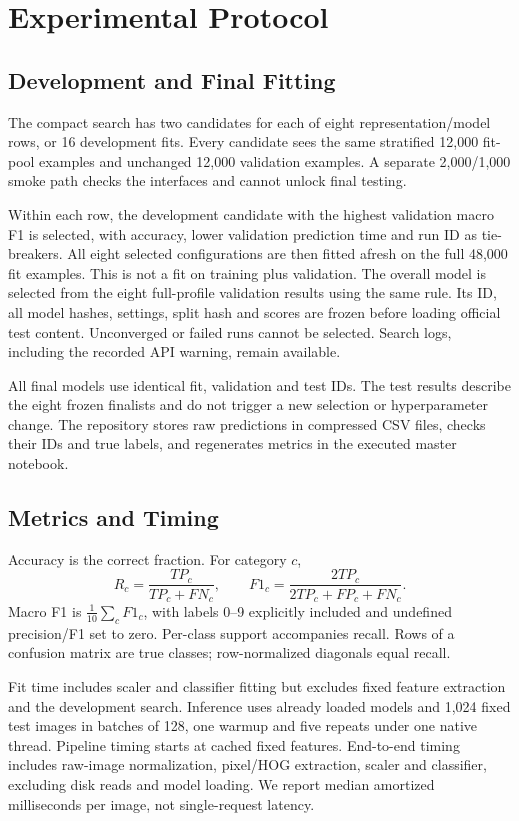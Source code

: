 \documentclass[conference]{IEEEtran}
\begin{document}
\section{Experimental Protocol}
\subsection{Development and Final Fitting}
The compact search has two candidates for each of eight representation/model
rows, or 16 development fits. Every candidate sees the same stratified 12,000
fit-pool examples and unchanged 12,000 validation examples. A separate
2,000/1,000 smoke path checks the interfaces and cannot unlock final testing.

Within each row, the development candidate with the highest validation macro
F1 is selected, with accuracy, lower validation prediction time and run ID as
tie-breakers. All eight selected configurations are then fitted afresh on the
full 48,000 fit examples. This is not a fit on training plus validation.
The overall model is selected from the eight full-profile validation results
using the same rule. Its ID, all model hashes, settings, split hash and scores
are frozen before loading official test content. Unconverged or failed runs
cannot be selected. Search logs, including the recorded API warning, remain
available.

All final models use identical fit, validation and test IDs. The test results
describe the eight frozen finalists and do not trigger a new selection or
hyperparameter change. The repository stores raw predictions in compressed
CSV files, checks their IDs and true labels, and regenerates metrics in the
executed master notebook.

\subsection{Metrics and Timing}
Accuracy is the correct fraction. For category $c$,
\begin{equation}
R_c=\frac{TP_c}{TP_c+FN_c},\qquad
F1_c=\frac{2TP_c}{2TP_c+FP_c+FN_c}.
\end{equation}
Macro F1 is $\frac{1}{10}\sum_c F1_c$, with labels 0--9 explicitly included and
undefined precision/F1 set to zero. Per-class support accompanies recall.
Rows of a confusion matrix are true classes; row-normalized diagonals equal
recall.

Fit time includes scaler and classifier fitting but excludes fixed feature
extraction and the development search. Inference uses already loaded models
and 1,024 fixed test images in batches of 128, one warmup and five repeats
under one native thread. Pipeline timing starts at cached fixed features.
End-to-end timing includes raw-image normalization, pixel/HOG extraction,
scaler and classifier, excluding disk reads and model loading. We report
median amortized milliseconds per image, not single-request latency.
\end{document}
